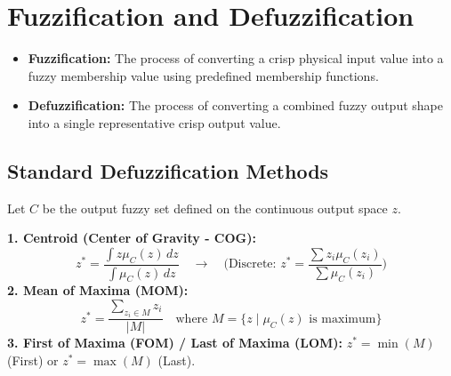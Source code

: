 \documentclass[12pt,a4paper]{article}
\begin{document}
\section{Fuzzification and Defuzzification}

\begin{itemize}[leftmargin=*, itemsep=3pt]
  \item \textbf{Fuzzification:} The process of converting a crisp physical input value into a fuzzy membership value using predefined membership functions.
  \item \textbf{Defuzzification:} The process of converting a combined fuzzy output shape into a single representative crisp output value.
\end{itemize}

\subsection{Standard Defuzzification Methods}
Let $C$ be the output fuzzy set defined on the continuous output space $z$.

\begin{tcolorbox}[formulabox, title={Mathematical Formulations of Defuzzification}]
\textbf{1. Centroid (Center of Gravity - COG):}
\begin{equation}
  z^* = \frac{\int z \mu_C(z) \, dz}{\int \mu_C(z) \, dz} \quad \rightarrow \quad \text{(Discrete: } z^* = \frac{\sum z_i \mu_C(z_i)}{\sum \mu_C(z_i)}\text{)}
\end{equation}
\textbf{2. Mean of Maxima (MOM):}
\begin{equation}
  z^* = \frac{\sum_{z_i \in M} z_i}{|M|} \quad \text{where } M = \{z \mid \mu_C(z) \text{ is maximum}\}
\end{equation}
\textbf{3. First of Maxima (FOM) / Last of Maxima (LOM):}
$z^* = \min(M)$ (First) or $z^* = \max(M)$ (Last).
\end{tcolorbox}
\end{document}
